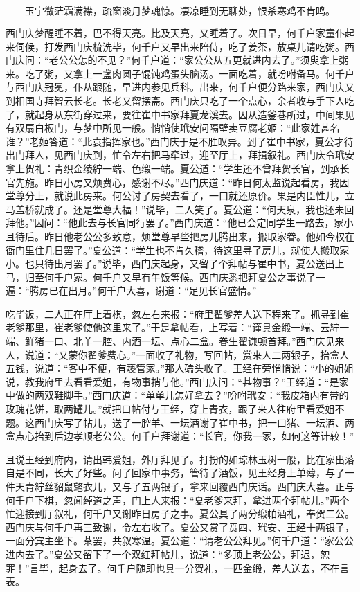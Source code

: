 \[
玉宇微茫霜满襟，疏窗淡月梦魂惊。
凄凉睡到无聊处，恨杀寒鸡不肯鸣。
\]

西门庆梦醒睡不着，巴不得天亮。比及天亮，又睡着了。次日早，何千户家童仆起来伺候，打发西门庆梳洗毕，何千户又早出来陪侍，吃了姜茶，放桌儿请吃粥。西门庆问：“老公公怎的不见？”何千户道：“家公公从五更就进内去了。”须臾拿上粥来。吃了粥，又拿上一盏肉圆子馄饨鸡蛋头脑汤。一面吃着，就吩咐备马。何千户与西门庆冠冕，仆从跟随，早进内参见兵科。出来，何千户便分路来家，西门庆又到相国寺拜智云长老。长老又留摆斋。西门庆只吃了一个点心，余者收与手下人吃了，就起身从东街穿过来，要往崔中书家拜夏龙溪去。因从造釜巷所过，中间果见有双扇白板门，与梦中所见一般。悄悄使玳安问隔壁卖豆腐老姬：“此家姓甚名谁？”老姬答道：“此袁指挥家也。”西门庆于是不胜叹异。到了崔中书家，夏公才待出门拜人，见西门庆到，忙令左右把马牵过，迎至厅上，拜揖叙礼。西门庆令玳安拿上贺礼：青织金绫紵一端、色缎一端。夏公道：“学生还不曾拜贺长官，到承长官先施。昨日小房又烦费心，感谢不尽。”西门庆道：“昨日何太监说起看房，我因堂尊分上，就说此房来。何公讨了房契去看了，一口就还原价。果是内臣性儿，立马盖桥就成了。还是堂尊大福！”说毕，二人笑了。夏公道：“何天泉，我也还未回拜他。”因问：“他此去与长官同行罢了。”西门庆道：“他已会定同学生一路去，家小且待后。昨日他老公公多致意，烦堂尊早些把房儿腾出来，搬取家眷。他如今权在衙门里住几日罢了。”夏公道：“学生也不肯久稽，待这里寻了房儿，就使人搬取家小。也只待出月罢了。”说毕，西门庆起身，又留了个拜帖与崔中书，夏公送出上马，归至何千户家。何千户又早有午饭等候。西门庆悉把拜夏公之事说了一遍：“腾房已在出月。”何千户大喜，谢道：“足见长官盛情。”

吃毕饭，二人正在厅上着棋，忽左右来报：“府里翟爹差人送下程来了。抓寻到崔老爹那里，崔老爹使他这里来了。”于是拿帖看，上写着：“谨具金缎一端、云紵一端、鲜猪一口、北羊一腔、内酒一坛、点心二盒。眷生翟谦顿首拜。”西门庆见来人，说道：“又蒙你翟爹费心。”一面收了礼物，写回帖，赏来人二两银子，抬盒人五钱，说道：“客中不便，有亵管家。”那人磕头收了。王经在旁悄悄说：“小的姐姐说，教我府里去看看爱姐，有物事捎与他。”西门庆问：“甚物事？”王经道：“是家中做的两双鞋脚手。”西门庆道：“单单儿怎好拿去？”吩咐玳安：“我皮箱内有带的玫瑰花饼，取两罐儿。”就把口帖付与王经，穿上青衣，跟了来人往府里看爱姐不题。这西门庆写了帖儿，送了一腔羊、一坛酒谢了崔中书，把一口猪、一坛酒、两盒点心抬到后边孝顺老公公。何千户拜谢道：“长官，你我一家，如何这等计较！”

且说王经到府内，请出韩爱姐，外厅拜见了。打扮的如琼林玉树一般，比在家出落自是不同，长大了好些。问了回家中事务，管待了酒饭，见王经身上单薄，与了一件天青紵丝貂鼠氅衣儿，又与了五两银子，拿来回覆西门庆话。西门庆大喜。正与何千户下棋，忽闻绰道之声，门上人来报：“夏老爹来拜，拿进两个拜帖儿。”两个忙迎接到厅叙礼，何千户又谢昨日房子之事。夏公具了两分缎帕酒礼，奉贺二公。西门庆与何千户再三致谢，令左右收了。夏公又赏了贲四、玳安、王经十两银子，一面分宾主坐下。茶罢，共叙寒温。夏公道：“请老公公拜见。”何千户道：“家公公进内去了。”夏公又留下了一个双红拜帖儿，说道：“多顶上老公公，拜迟，恕罪！”言毕，起身去了。何千户随即也具一分贺礼，一匹金缎，差人送去，不在言表。

